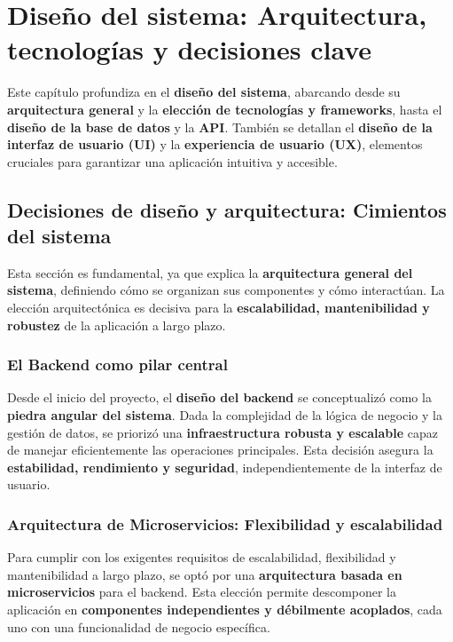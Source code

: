 \chapter{Diseño del sistema: Arquitectura, tecnologías y decisiones clave}\label{cap:disenio}

Este capítulo profundiza en el \textbf{diseño del sistema}, abarcando desde su \textbf{arquitectura general} y la \textbf{elección de tecnologías y frameworks}, hasta el \textbf{diseño de la base de datos} y la \textbf{API}. También se detallan el \textbf{diseño de la interfaz de usuario (UI)} y la \textbf{experiencia de usuario (UX)}, elementos cruciales para garantizar una aplicación intuitiva y accesible.

\section{Decisiones de diseño y arquitectura: Cimientos del sistema}

Esta sección es fundamental, ya que explica la \textbf{arquitectura general del sistema}, definiendo cómo se organizan sus componentes y cómo interactúan. La elección arquitectónica es decisiva para la \textbf{escalabilidad, mantenibilidad y robustez} de la aplicación a largo plazo.

\subsection{El Backend como pilar central}

Desde el inicio del proyecto, el \textbf{diseño del backend} se conceptualizó como la \textbf{piedra angular del sistema}. Dada la complejidad de la lógica de negocio y la gestión de datos, se priorizó una \textbf{infraestructura robusta y escalable} capaz de manejar eficientemente las operaciones principales. Esta decisión asegura la \textbf{estabilidad, rendimiento y seguridad}, independientemente de la interfaz de usuario.

\subsection{Arquitectura de Microservicios: Flexibilidad y escalabilidad}

Para cumplir con los exigentes requisitos de escalabilidad, flexibilidad y mantenibilidad a largo plazo, se optó por una \textbf{arquitectura basada en microservicios} para el backend. Esta elección permite descomponer la aplicación en \textbf{componentes independientes y débilmente acoplados}, cada uno con una funcionalidad de negocio específica.


